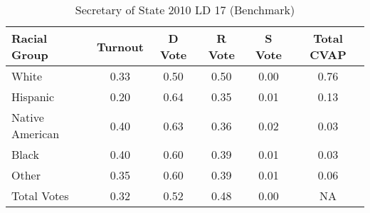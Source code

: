 \begin{table}[htb]
\begin{center}
\caption{Secretary of State 2010 LD 17 (Benchmark)}
\label{sos10_cvap_ld_17_benchmark}
\begin{tabular}{lccccc}
  \hline
Racial Group & Turnout & D Vote & R Vote & S Vote & Total CVAP \\ 
  \hline
    White & 0.33  & 0.50  & 0.50  & 0.00  & 0.76 \\
    Hispanic & 0.20  & 0.64  & 0.35  & 0.01  & 0.13 \\
    Native American & 0.40  & 0.63  & 0.36  & 0.02  & 0.03 \\
    Black & 0.40  & 0.60  & 0.39  & 0.01  & 0.03 \\
    Other & 0.35  & 0.60  & 0.39  & 0.01  & 0.06 \\
    Total Votes & 0.32  & 0.52  & 0.48  & 0.00  &  NA \\
   \hline
\end{tabular}
\end{center}
\end{table}
